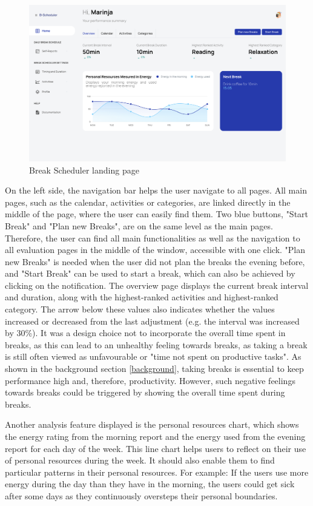 \documentclass{hasel_thesis}
\begin{document}
\begin{figure}[htp]
    \centering
    \includegraphics[width=15cm]{hasel_thesis/images/dashboard.png}
    \caption{Break Scheduler landing page}
    \label{fig:dashboard}
\end{figure}
On the left side, the navigation bar helps the user navigate to all pages. All main pages, such as the calendar, activities or categories, are linked directly in the middle of the page, where the user can easily find them. Two blue buttons, "Start Break" and "Plan new Breaks", are on the same level as the main pages. Therefore, the user can find all main functionalities as well as the navigation to all evaluation pages in the middle of the window, accessible with one click. "Plan new Breaks" is needed when the user did not plan the breaks the evening before, and "Start Break" can be used to start a break, which can also be achieved by clicking on the notification. The overview page displays the current break interval and duration, along with the highest-ranked activities and highest-ranked category. The arrow below these values also indicates whether the values increased or decreased from the last adjustment (e.g. the interval was increased by 30\%). It was a design choice not to incorporate the overall time spent in breaks, as this can lead to an unhealthy feeling towards breaks, as taking a break is still often viewed as unfavourable or "time not spent on productive tasks". As shown in the background section \ref{background}, taking breaks is essential to keep performance high and, therefore, productivity. However, such negative feelings towards breaks could be triggered by showing the overall time spent during breaks.

Another analysis feature displayed is the personal resources chart, which shows the energy rating from the morning report and the energy used from the evening report for each day of the week. This line chart helps users to reflect on their use of personal resources during the week. It should also enable them to find particular patterns in their personal resources. For example: If the users use more energy during the day than they have in the morning, the users could get sick after some days as they continuously oversteps their personal boundaries. 
\end{document}
